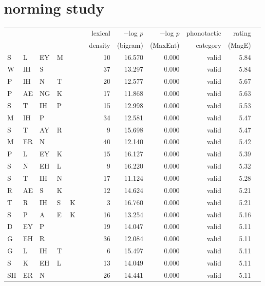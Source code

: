 \section{\citet{Albright2003b} norming study} 

\begin{longtable}{l@{ } l@{ } l@{ } l@{ } l@{ } l r r r r r r} 
\toprule
   &    &    &    &    &   & lexical & $-$log $p$ & $-$log $p$ & phonotactic & rating \\
&&&&&& density & (bigram) & (MaxEnt) & category & (MagE) \\
\midrule
S  & L  & EY & M  &    &   & 10 & 16.570 & 0.000 & valid   & 5.84 \\
W  & IH & S  &    &    &   & 37 & 13.297 & 0.000 & valid   & 5.84 \\
P  & IH & N  & T  &    &   & 20 & 12.577 & 0.000 & valid   & 5.67 \\
P  & AE & NG & K  &    &   & 17 & 11.868 & 0.000 & valid   & 5.63 \\
S  & T  & IH & P  &    &   & 15 & 12.998 & 0.000 & valid   & 5.53 \\
M  & IH & P  &    &    &   & 34 & 12.581 & 0.000 & valid   & 5.47 \\
S  & T  & AY & R  &    &   &  9 & 15.698 & 0.000 & valid   & 5.47 \\
M  & ER & N  &    &    &   & 40 & 12.140 & 0.000 & valid   & 5.42 \\
P  & L  & EY & K  &    &   & 15 & 16.127 & 0.000 & valid   & 5.39 \\
S  & N  & EH & L  &    &   &  9 & 16.220 & 0.000 & valid   & 5.32 \\
S  & T  & IH & N  &    &   & 17 & 11.124 & 0.000 & valid   & 5.28 \\
R  & AE & S  & K  &    &   & 12 & 14.624 & 0.000 & valid   & 5.21 \\
T  & R  & IH & S  & K  &   &  3 & 16.760 & 0.000 & valid   & 5.21 \\
S  & P  & A  & E  & K  &   & 16 & 13.254 & 0.000 & valid   & 5.16 \\
D  & EY & P  &    &    &   & 19 & 14.047 & 0.000 & valid   & 5.11 \\
G  & EH & R  &    &    &   & 36 & 12.084 & 0.000 & valid   & 5.11 \\
G  & L  & IH & T  &    &   &  6 & 15.497 & 0.000 & valid   & 5.11 \\
S  & K  & EH & L  &    &   & 13 & 14.049 & 0.000 & valid   & 5.11 \\
SH & ER & N  &    &    &   & 26 & 14.441 & 0.000 & valid   & 5.11 \\

\end{longtable}
